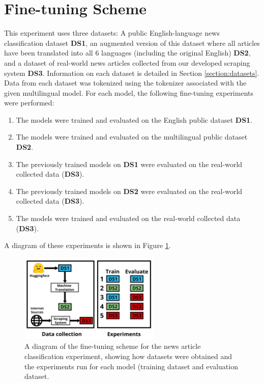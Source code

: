 \documentclass{l4proj}
\begin{document}
\section{Fine-tuning Scheme}
This experiment uses three datasets: A public English-language news classification dataset \textbf{DS1}, an augmented version of this dataset where all articles have been translated into all 6 languages (including the original English) \textbf{DS2}, and a dataset of real-world news articles collected from our developed scraping system \textbf{DS3}. 
Information on each dataset is detailed in Section \ref{section:datasets}. Data from each dataset was tokenized using the tokenizer associated with the given multilingual model. For each model, the following fine-tuning experiments were performed:
\begin{enumerate}
    \item The models were trained and evaluated on the English public dataset \textbf{DS1}. 
    \item The models were trained and evaluated on the multilingual public dataset \textbf{DS2}.
    \item The previously trained models on \textbf{DS1} were evaluated on the real-world collected data (\textbf{DS3}).
    \item The previously trained models on \textbf{DS2} were evaluated on the real-world collected data (\textbf{DS3}).
    \item The models were trained and evaluated on the real-world collected data (\textbf{DS3}).
\end{enumerate}
A diagram of these experiments is shown in Figure \ref{fig:finetuning-scheme}.

\begin{figure}[h]
\centering
\includegraphics[width=0.6\textwidth]{images/Finetuning Scheme.png}
\caption{A diagram of the fine-tuning scheme for the news article classification experiment, showing how datasets were obtained and the experiments run for each model (training dataset and evaluation dataset.}
\label{fig:finetuning-scheme}
\end{figure}
\end{document}
